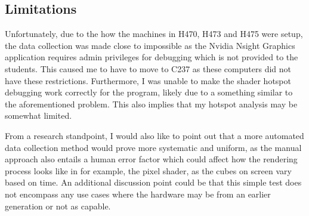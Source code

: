 \documentclass{article}
\begin{document}
\newpage

\subsection{Limitations}

Unfortunately, due to the how the machines in H470, H473 and H475 were setup, the data collection was made close to impossible as the Nvidia Nsight Graphics application requires
admin privileges for debugging which is not provided to the students. This caused me to have to move to C237 as these computers did not have these restrictions. Furthermore, I was
unable to make the shader hotspot debugging work correctly for the program, likely due to a something similar to the aforementioned problem. This also implies that my hotspot analysis
may be somewhat limited.

From a research standpoint, I would also like to point out that a more automated data collection method would prove more systematic and uniform, as the manual approach also entails
a human error factor which could affect how the rendering process looks like in for example, the pixel shader, as the cubes on screen vary based on time. An additional discussion point
could be that this simple test does not encompass any use cases where the hardware may be from an earlier generation or not as capable.
\end{document}
